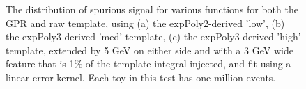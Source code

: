 \begin{figure} 
\begin{center}

\caption{The distribution of spurious signal for various functions for both the GPR and raw template, using (a) the expPoly2-derived 'low', (b) the expPoly3-derived 'med' template, (c) the expPoly3-derived 'high' template, extended by 5 GeV on either side and with a 3 GeV wide feature that is 1\% of the template integral injected, and fit using a linear error kernel. Each toy in this test has one million events.}
\label{fig:linearkernel_lowpt_10k_Siginj}
\end{center}
\end{figure}


